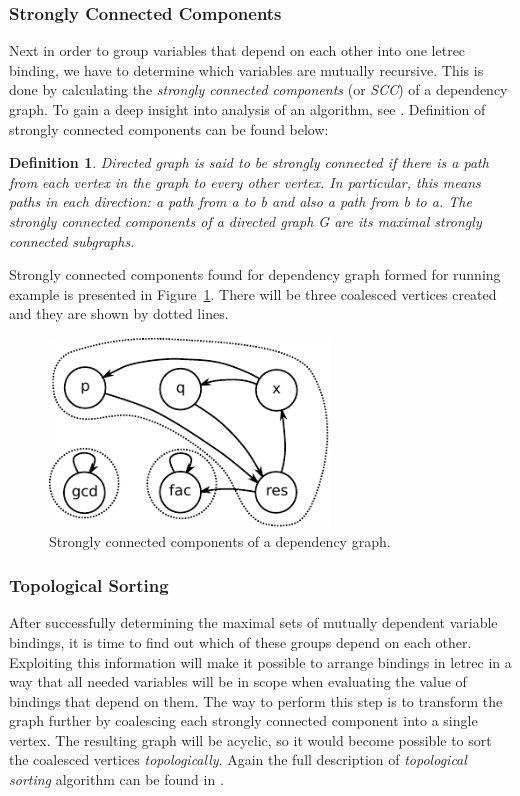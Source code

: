 \documentclass[12pt,a4paper]{report}
\newtheorem{definition}{Definition}[chapter]
\begin{document}
\subsubsection{Strongly Connected Components}
Next in order to group variables that depend on each other into one letrec
binding, we have to determine which variables are mutually recursive. This is
done by calculating the \textit{strongly connected components} (or
\textit{SCC}) of a dependency graph. To gain a deep insight into analysis of an
algorithm, see \cite{Cormen03}. Definition of strongly connected components can
be found below:

\begin{definition}
Directed graph is said to be strongly connected if there is a path from each
vertex in the graph to every other vertex. In particular, this means paths in
each direction: a path from a to b and also a path from b to a.
The strongly connected components of a directed graph G are its maximal
strongly connected subgraphs.
\end{definition}

Strongly connected components found for dependency graph formed for running
example is presented in Figure~\ref{fig:topsorted_scc}. There will be three
coalesced vertices created and they are shown by dotted lines.

\vspace*{0.2in}
\begin{figure}[h!]
  \centering
  \includegraphics[height=5cm]{scc_graph}
  \caption{Strongly connected components of a dependency graph.}
  \label{fig:topsorted_scc}
\end{figure}

\subsubsection{Topological Sorting}
After successfully determining the maximal sets of mutually dependent variable
bindings, it is time to find out which of these groups depend on each other.
Exploiting this information will make it possible to arrange bindings in letrec
in a way that all needed variables will be in scope when evaluating the value
of bindings that depend on them. The way to perform this step is to transform
the graph further by coalescing each strongly connected component into a single
vertex.  The resulting graph will be acyclic, so it would become possible to
sort the coalesced vertices \textit{topologically}. Again the full description
of \textit{topological sorting} algorithm can be found in \cite{Cormen03}.
\end{document}
